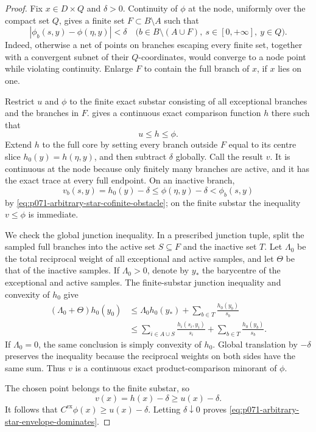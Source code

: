 \begin{proof}
Fix \(x\in D\times Q\) and \(\delta>0\).  Continuity of \(\phi\) at the
node, uniformly over the compact set \(Q\), gives a finite set
\(F\subset B\setminus A\) such that
\begin{equation}
 |\phi_b(s,y)-\phi(\eta,y)|<\delta
 \quad
 \bigl(b\in B\setminus(A\cup F),\
       s\in[0,+\infty],\ y\in Q\bigr).
 \label{eq:p071-arbitrary-star-cofinite-obstacle}
\end{equation}
Indeed, otherwise a net of points on branches escaping every finite set,
together with a convergent subnet of their \(Q\)-coordinates, would
converge to a node point while violating continuity.  Enlarge \(F\) to
contain the full branch of \(x\), if \(x\) lies on one.

Restrict \(u\) and \(\phi\) to the finite exact substar consisting of all
exceptional branches and the branches in \(F\).
 gives a continuous
exact comparison function \(h\) there such that
\[
                              u\leq h\leq\phi.
\]
Extend \(h\) to the full core by setting every branch outside \(F\) equal
to its centre slice \(h_0(y)=h(\eta,y)\), and then subtract \(\delta\)
globally.  Call the result \(v\).  It is continuous at the node because
only finitely many branches are active, and it has the exact trace at every
full endpoint.  On an inactive branch,
\[
 v_b(s,y)=h_0(y)-\delta
       \leq\phi(\eta,y)-\delta
       <\phi_b(s,y)
\]
by \eqref{eq:p071-arbitrary-star-cofinite-obstacle}; on the finite substar
the inequality \(v\leq\phi\) is immediate.

We check the global junction inequality.  In a prescribed junction tuple,
split the sampled full branches into the active set \(S\subseteq F\) and
the inactive set \(T\).  Let \(\Lambda_0\) be the total reciprocal weight
of all exceptional and active samples, and let \(\Theta\) be that of the
inactive samples.  If \(\Lambda_0>0\), denote by \(y_*\) the barycentre of
the exceptional and active samples.  The finite-substar junction inequality
and convexity of \(h_0\) give
\[
 \begin{split}
  (\Lambda_0+\Theta)h_0(y_0)
  &\leq \Lambda_0h_0(y_*)
       +\sum_{b\in T}\frac{h_0(y_b)}{s_b}\\
  &\leq
       \sum_{i\in A\cup S}\frac{h_i(s_i,y_i)}{s_i}
       +\sum_{b\in T}\frac{h_0(y_b)}{s_b}.
 \end{split}
\]
If \(\Lambda_0=0\), the same conclusion is simply convexity of \(h_0\).
Global translation by \(-\delta\) preserves the inequality because the
reciprocal weights on both sides have the same sum.  Thus \(v\) is a
continuous exact product-comparison minorant of \(\phi\).

The chosen point belongs to the finite substar, so
\[
                         v(x)=h(x)-\delta\geq u(x)-\delta.
\]
It follows that
\(C^{\mathrm{ex}}\phi(x)\geq u(x)-\delta\).  Letting \(\delta\downarrow0\)
proves \eqref{eq:p071-arbitrary-star-envelope-dominates}.
\end{proof}

